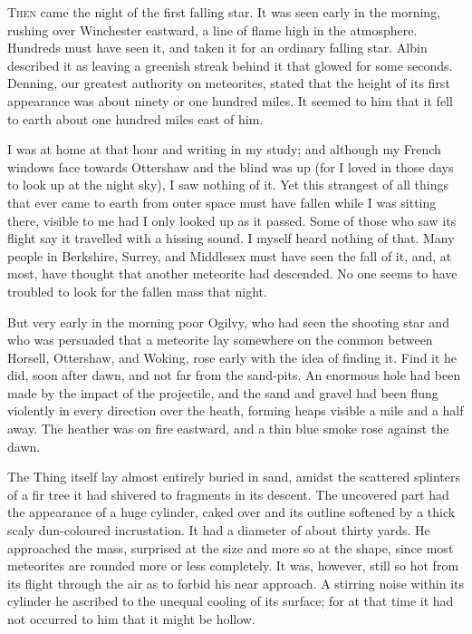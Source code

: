 


\lettrine[lines=4,findent=2pt]{T}{hen} came the night of the first falling star. It was seen early in the morning, rushing over Winchester eastward, a line of flame high in the atmosphere. Hundreds must have seen it, and taken it for an ordinary falling star. Albin described it as leaving a greenish streak behind it that glowed for some seconds. Denning, our greatest authority on meteorites, stated that the height of its first appearance was about ninety or one hundred miles. It seemed to him that it fell to earth about one hundred miles east of him.

I was at home at that hour and writing in my study; and although my French windows face towards Ottershaw and the blind was up (for I loved in those days to look up at the night sky), I saw nothing of it. Yet this strangest of all things that ever came to earth from outer space must have fallen while I was sitting there, visible to me had I only looked up as it passed. Some of those who saw its flight say it travelled with a hissing sound. I myself heard nothing of that. Many people in Berkshire, Surrey, and Middlesex must have seen the fall of it, and, at most, have thought that another meteorite had descended. No one seems to have troubled to look for the fallen mass that night.

But very early in the morning poor Ogilvy, who had seen the shooting star and who was persuaded that a meteorite lay somewhere on the common between Horsell, Ottershaw, and Woking, rose early with the idea of finding it. Find it he did, soon after dawn, and not far from the sand-pits. An enormous hole had been made by the impact of the projectile, and the sand and gravel had been flung violently in every direction over the heath, forming heaps visible a mile and a half away. The heather was on fire eastward, and a thin blue smoke rose against the dawn.


The Thing itself lay almost entirely buried in sand, amidst the scattered splinters of a fir tree it had shivered to fragments in its descent. The uncovered part had the appearance of a huge cylinder, caked over and its outline softened by a thick scaly dun-coloured incrustation. It had a diameter of about thirty yards. He approached the mass, surprised at the size and more so at the shape, since most meteorites are rounded more or less completely. It was, however, still so hot from its flight through the air as to forbid his near approach. A stirring noise within its cylinder he ascribed to the unequal cooling of its surface; for at that time it had not occurred to him that it might be hollow.


